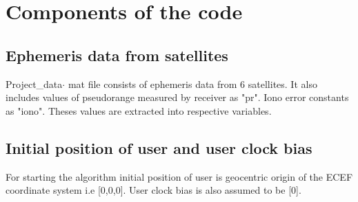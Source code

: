 \documentclass[conference,compsoc]{IEEEtran}
\begin{document}
\section{Components of the code}
\subsection{Ephemeris data from satellites}
Project\_data$\cdot$ mat file consists of ephemeris data from 6 satellites. It also includes values of pseudorange measured by receiver as "pr". Iono error constants as "iono". Theses values are extracted into respective variables. 
\subsection{Initial position of user and user clock bias}
For starting the algorithm initial position of user is geocentric origin of the ECEF coordinate system i.e [0,0,0]. User clock bias is also assumed to be [0].
\end{document}

